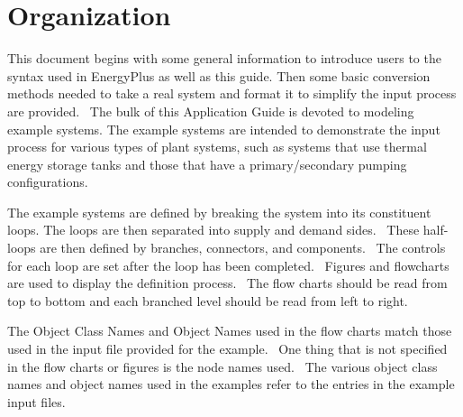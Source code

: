 \section{Organization}\label{organization}

This document begins with some general information to introduce users to the syntax used in EnergyPlus as well as this guide. Then some basic conversion methods needed to take a real system and format it to simplify the input process are provided.~ The bulk of this Application Guide is devoted to modeling example systems. The example systems are intended to demonstrate the input process for various types of plant systems, such as systems that use thermal energy storage tanks and those that have a primary/secondary pumping configurations.

The example systems are defined by breaking the system into its constituent loops. The loops are then separated into supply and demand sides.~ These half-loops are then defined by branches, connectors, and components.~ The controls for each loop are set after the loop has been completed.~ Figures and flowcharts are used to display the definition process.~ The flow charts should be read from top to bottom and each branched level should be read from left to right.

The Object Class Names and Object Names used in the flow charts match those used in the input file provided for the example.~ One thing that is not specified in the flow charts or figures is the node names used.~ The various object class names and object names used in the examples refer to the entries in the example input files.
